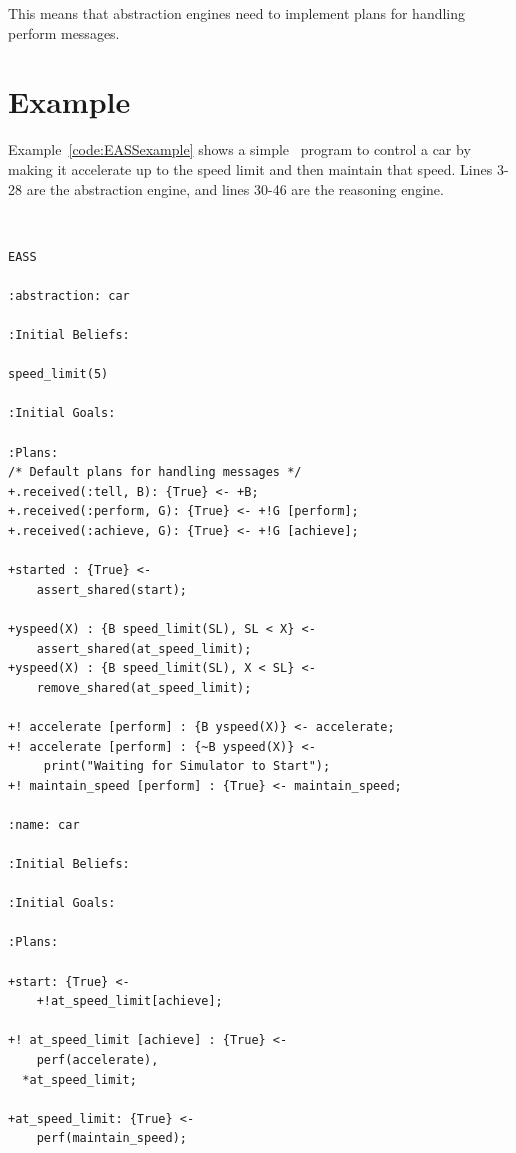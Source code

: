 This means that abstraction engines need to implement plans for handling perform messages.

\section{Example}
Example~\ref{code:EASSexample} shows a simple \eass\ program to control a car by making it accelerate up to the speed limit and then maintain that speed.  Lines 3-28 are the abstraction engine, and lines 30-46 are the reasoning engine.

\begin{ourexample}
\label{code:EASSexample} \quad \\
\begin{lstlisting}[basicstyle=\sffamily,style=easslisting,language=Gwendolen]
EASS

:abstraction: car

:Initial Beliefs:

speed_limit(5)
											
:Initial Goals:
		
:Plans: 
/* Default plans for handling messages */
+.received(:tell, B): {True} <- +B;   
+.received(:perform, G): {True} <- +!G [perform];
+.received(:achieve, G): {True} <- +!G [achieve];

+started : {True} <-
	assert_shared(start);

+yspeed(X) : {B speed_limit(SL), SL < X} <-
	assert_shared(at_speed_limit);
+yspeed(X) : {B speed_limit(SL), X < SL} <-
	remove_shared(at_speed_limit);
	
+! accelerate [perform] : {B yspeed(X)} <- accelerate;
+! accelerate [perform] : {~B yspeed(X)} <- 
     print("Waiting for Simulator to Start");
+! maintain_speed [perform] : {True} <- maintain_speed;

:name: car
			
:Initial Beliefs:
													
:Initial Goals:
		
:Plans: 

+start: {True} <-
	+!at_speed_limit[achieve];

+! at_speed_limit [achieve] : {True} <-
	perf(accelerate),
  *at_speed_limit;

+at_speed_limit: {True} <-
	perf(maintain_speed);
\end{lstlisting}
\end{ourexample}

